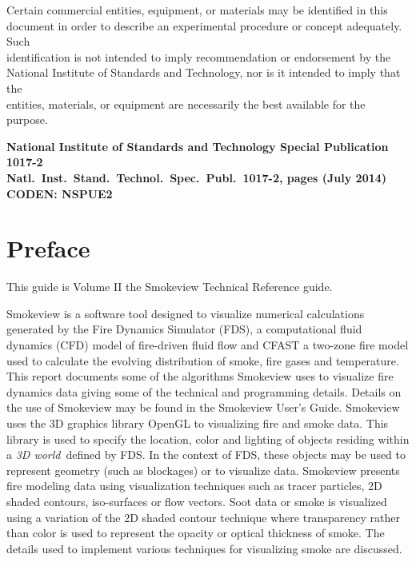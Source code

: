 \documentclass[11pt,twoside]{book}
\begin{document}
\begin{minipage}[t][9in][s]{6.5in}

\begin{flushright}
Certain commercial entities, equipment, or materials may be identified in this \\
document in order to describe an experimental procedure or concept adequately. Such \\
identification is not intended to imply recommendation or endorsement by the \\
National Institute of Standards and Technology, nor is it intended to imply that the \\
entities, materials, or equipment are necessarily the best available for the purpose.
\end{flushright}

\vspace{3in}

\large
\begin{flushright}
\bf National Institute of Standards and Technology Special Publication 1017-2\\
Natl.~Inst.~Stand.~Technol.~Spec.~Publ.~1017-2, \pageref{LastPage} pages (July 2014) \\
CODEN: NSPUE2
\end{flushright}

\vfill

\end{minipage}


\frontmatter
\pagestyle{plain}

%
%

\chapter{Preface}
\smvoverview
This guide is Volume II the Smokeview Technical Reference guide.

Smokeview is a software tool designed to visualize numerical
calculations generated by the Fire Dynamics Simulator (FDS), a
computational fluid dynamics (CFD) model of fire-driven fluid flow
and CFAST a two-zone fire model used to calculate the evolving
distribution of smoke, fire gases and temperature. This report
documents some of the algorithms Smokeview uses to visualize fire
dynamics data giving some of the technical and programming
details. Details on the use of Smokeview may be found in the
Smokeview User's Guide. Smokeview uses the 3D graphics library
OpenGL to visualizing fire and smoke data. This library is used to
specify the location, color and lighting of objects residing
within a {\em 3D world}\ defined by FDS. In the context of FDS,
these objects may be used to represent geometry (such as
blockages) or to visualize data. Smokeview presents fire modeling
data using visualization techniques such as tracer particles, 2D
shaded contours, iso-surfaces or flow vectors.  Soot data or smoke
is visualized using a variation of the 2D shaded contour technique
where transparency rather than color is used to represent the
opacity or optical thickness of smoke.  The details used to
implement various techniques for visualizing smoke are discussed.
\end{document}
